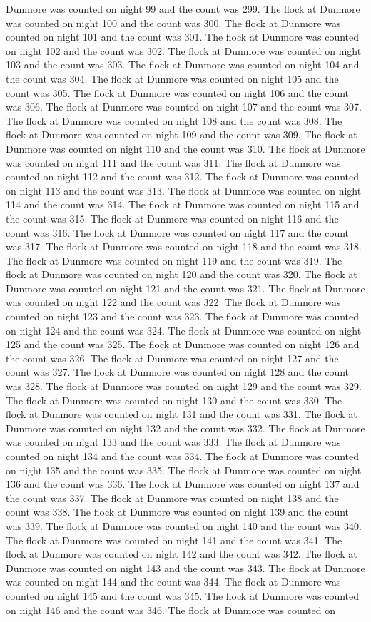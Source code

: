 Dunmore was counted on night 99 and the count was 299. The flock at Dunmore was counted on night 100 and the count was 300. The flock at Dunmore was counted on night 101 and the count was 301. The flock at Dunmore was counted on night 102 and the count was 302. The flock at Dunmore was counted on night 103 and the count was 303. The flock at Dunmore was counted on night 104 and the count was 304. The flock at Dunmore was counted on night 105 and the count was 305. The flock at Dunmore was counted on night 106 and the count was 306. The flock at Dunmore was counted on night 107 and the count was 307. The flock at Dunmore was counted on night 108 and the count was 308. The flock at Dunmore was counted on night 109 and the count was 309. The flock at Dunmore was counted on night 110 and the count was 310. The flock at Dunmore was counted on night 111 and the count was 311. The flock at Dunmore was counted on night 112 and the count was 312. The flock at Dunmore was counted on night 113 and the count was 313. The flock at Dunmore was counted on night 114 and the count was 314. The flock at Dunmore was counted on night 115 and the count was 315. The flock at Dunmore was counted on night 116 and the count was 316. The flock at Dunmore was counted on night 117 and the count was 317. The flock at Dunmore was counted on night 118 and the count was 318. The flock at Dunmore was counted on night 119 and the count was 319. The flock at Dunmore was counted on night 120 and the count was 320. The flock at Dunmore was counted on night 121 and the count was 321. The flock at Dunmore was counted on night 122 and the count was 322. The flock at Dunmore was counted on night 123 and the count was 323. The flock at Dunmore was counted on night 124 and the count was 324. The flock at Dunmore was counted on night 125 and the count was 325. The flock at Dunmore was counted on night 126 and the count was 326. The flock at Dunmore was counted on night 127 and the count was 327. The flock at Dunmore was counted on night 128 and the count was 328. The flock at Dunmore was counted on night 129 and the count was 329. The flock at Dunmore was counted on night 130 and the count was 330. The flock at Dunmore was counted on night 131 and the count was 331. The flock at Dunmore was counted on night 132 and the count was 332. The flock at Dunmore was counted on night 133 and the count was 333. The flock at Dunmore was counted on night 134 and the count was 334. The flock at Dunmore was counted on night 135 and the count was 335. The flock at Dunmore was counted on night 136 and the count was 336. The flock at Dunmore was counted on night 137 and the count was 337. The flock at Dunmore was counted on night 138 and the count was 338. The flock at Dunmore was counted on night 139 and the count was 339. The flock at Dunmore was counted on night 140 and the count was 340. The flock at Dunmore was counted on night 141 and the count was 341. The flock at Dunmore was counted on night 142 and the count was 342. The flock at Dunmore was counted on night 143 and the count was 343. The flock at Dunmore was counted on night 144 and the count was 344. The flock at Dunmore was counted on night 145 and the count was 345. The flock at Dunmore was counted on night 146 and the count was 346. The flock at Dunmore was counted on 